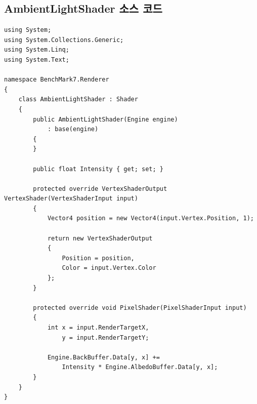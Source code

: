 \documentclass[a4paper,itemph,amsmath,oneside,11pt,openany]{xoblivoir}
\begin{document}
\subsection{AmbientLightShader 소스 코드}
\begin{verbatim}
using System;
using System.Collections.Generic;
using System.Linq;
using System.Text;

namespace BenchMark7.Renderer
{
    class AmbientLightShader : Shader
    {
        public AmbientLightShader(Engine engine)
            : base(engine)
        {
        }

        public float Intensity { get; set; }

        protected override VertexShaderOutput VertexShader(VertexShaderInput input)
        {
            Vector4 position = new Vector4(input.Vertex.Position, 1);

            return new VertexShaderOutput
            {
                Position = position,
                Color = input.Vertex.Color
            };
        }

        protected override void PixelShader(PixelShaderInput input)
        {
            int x = input.RenderTargetX,
                y = input.RenderTargetY;

            Engine.BackBuffer.Data[y, x] +=
                Intensity * Engine.AlbedoBuffer.Data[y, x];
        }
    }
}
\end{verbatim}
\end{document}
